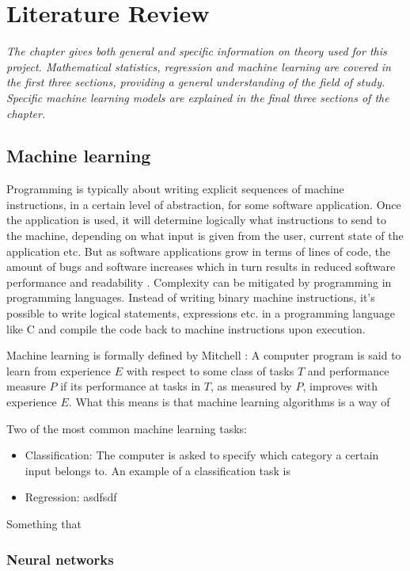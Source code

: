 \chapter{Literature Review}
\emph{The chapter gives both general and specific information on theory used for this project.  Mathematical statistics, regression and machine learning are covered in the first three sections, providing a general understanding of the field of study. Specific machine learning models are explained in the final three sections of the chapter. }


\section{Machine learning}
	Programming is typically about writing explicit sequences of machine instructions, in a certain level of abstraction, for some software application. Once the application is used, it will determine logically what instructions to send to the machine, depending on what input is given from the user, current state of the application etc. But as software applications grow in terms of lines of code, the amount of bugs and software increases which in turn results in reduced software performance and readability \cite{IP:1}. Complexity can be mitigated by programming in programming languages. Instead of writing binary machine instructions, it's possible to write logical statements, expressions etc. in a programming language like C and compile the code back to machine instructions upon execution. 
	
Machine learning is formally defined by Mitchell \cite{BOOK:2}: 
	A computer program is said to learn from experience $E$ with respect to some class of tasks $T$ and performance measure $P$ if its performance at tasks in $T$, as measured by $P$, improves with experience $E$.
	What this means is that machine learning algorithms is a way of 
	
	Two of the most common machine learning tasks: 
	\begin{itemize}
		\item{Classification:} The computer is asked to specify which category a certain input belongs to. An example of a classification task is  
		\item{Regression:} asdfsdf
	\end{itemize} \cite{BOOK:1}
	Something that \cite{WEBSITE:1}
\subsection{Neural networks}

